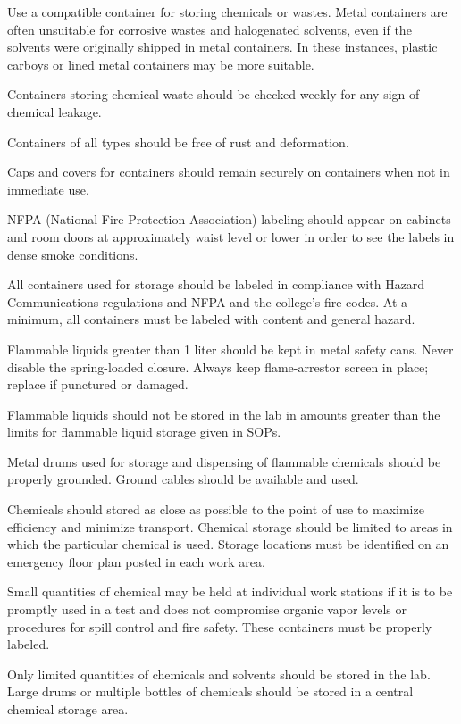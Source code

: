 \documentclass[12pt]{../SOP3_beta}\usepackage[]{graphicx}\usepackage[]{color}
\begin{document}
\NP Use a compatible container for storing chemicals or wastes. Metal containers are often unsuitable for corrosive wastes and halogenated solvents, even if the solvents were originally shipped in metal containers. In these instances, plastic carboys or lined metal containers may be more suitable. 

\NP Containers storing chemical waste should be checked weekly for any sign of chemical leakage.

\NP Containers of all types should be free of rust and deformation. 

\NP Caps and covers for containers should remain securely on containers when not in immediate use.

\NP NFPA (National Fire Protection Association) labeling should appear on cabinets and room doors at approximately waist level or lower in order to see the labels in dense smoke conditions.

\NP All containers used for storage should be labeled in compliance with Hazard Communications regulations and NFPA and the college’s fire codes. At a minimum, all containers must be labeled with content and general hazard.

\NP Flammable liquids greater than 1 liter should be kept in metal safety cans. Never disable the spring-loaded closure. Always keep flame-arrestor screen in place; replace if punctured or damaged. 

\NP Flammable liquids should not be stored in the lab in amounts greater than the limits for flammable liquid storage given in SOPs. 

\NP Metal drums used for storage and dispensing of flammable chemicals should be properly grounded. Ground cables should be available and used.

\NP Chemicals should stored as close as possible to the point of use to maximize efficiency and minimize transport. Chemical storage should be limited to areas in which the particular chemical is used. Storage locations must be identified on an emergency floor plan posted in each work area.

\NP Small quantities of chemical may be held at individual work stations if it is to be promptly used in a test and does not compromise organic vapor levels or procedures for spill control and fire safety. These containers must be properly labeled.

\NP Only limited quantities of chemicals and solvents should be stored in the lab. Large drums or multiple bottles of chemicals should be stored in a central chemical storage area.
\end{document}
